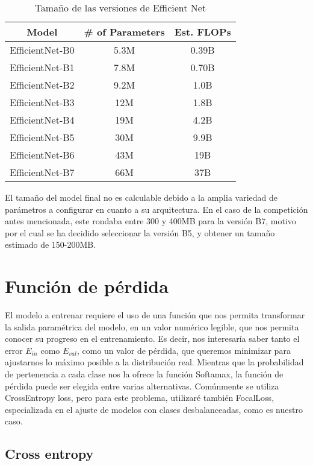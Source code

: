 \begin{table}[!ht]
	\centering
	\begin{tabular}{|c|c|c|}
		\hline
		\textbf{Model} & \textbf{\# of Parameters} & \textbf{Est. FLOPs} \\ \hline
		EfficientNet-B0 & 5.3M & 0.39B \\ \hline
		EfficientNet-B1 & 7.8M & 0.70B \\ \hline
		EfficientNet-B2 & 9.2M & 1.0B \\ \hline
		EfficientNet-B3 & 12M & 1.8B \\ \hline
		EfficientNet-B4 & 19M & 4.2B \\ \hline
		EfficientNet-B5 & 30M & 9.9B \\ \hline
		EfficientNet-B6 & 43M & 19B \\ \hline
		EfficientNet-B7 & 66M & 37B \\ \hline
	\end{tabular}
	\caption{Tamaño de las versiones de Efficient Net \cite{tan2020efficientnet}}
\end{table}

El tamaño del model final no es calculable debido a la amplia variedad de parámetros a configurar en cuanto a su arquitectura. En el caso de la competición antes mencionada, este rondaba entre 300 y 400MB para la versión B7, motivo por el cual se ha decidido seleccionar la versión B5, y obtener un tamaño estimado de 150-200MB.

\section{Función de pérdida}

El modelo a entrenar requiere el uso de una función que nos permita transformar la salida paramétrica del modelo, en un valor numérico legible, que nos permita conocer su progreso en el entrenamiento.  Es decir, nos interesaría saber tanto el error $E_{in}$ como $E_{val}$, como un valor de pérdida, que queremos minimizar para ajustarnos lo máximo posible a la distribución real. Mientras que la probabilidad de pertenencia a cada clase nos la ofrece la función Softamax, la función de pérdida puede ser elegida entre varias alternativas. Comúnmente se utiliza CrossEntropy loss, pero para este problema, utilizaré también FocalLoss, especializada en el ajuste de modelos con clases desbalanceadas, como es nuestro caso.

\subsection{Cross entropy}

